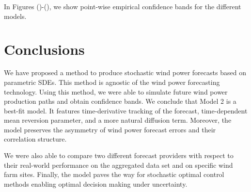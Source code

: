 \documentclass[10pt,twocolumn,letterpaper]{article}
\begin{document}
In Figures ()-(), we show point-wise empirical confidence bands for the different models.



\section{Conclusions}

We have proposed a method to produce stochastic wind power forecasts based on parametric SDEs. This method is agnostic of the wind power forecasting technology. Using this method, we were able to simulate future wind power production paths and obtain confidence bands. We conclude that Model 2 is a best-fit model. It features time-derivative tracking of the forecast, time-dependent mean reversion parameter, and a more natural diffusion term. Moreover, the model preserves the asymmetry of wind power forecast errors and their correlation structure.

We were also able to compare two different forecast providers with respect to their real-world performance on the aggregated data set and on specific wind farm sites. Finally, the model paves the way for stochastic optimal control methods enabling optimal decision making under uncertainty.






\end{document}
